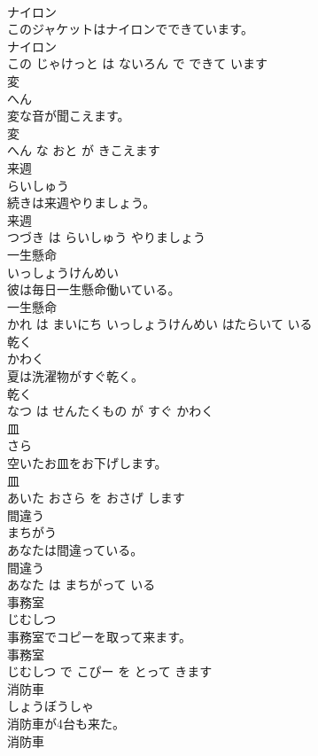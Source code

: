\documentclass[8pt]{extreport}
\begin{document}
\begin{CJK}{UTF8}{min}
\\	ナイロン	
\\	このジャケットはナイロンでできています。	
\\	ナイロン 
\\	この じゃけっと は ないろん で できて います			
\\	変	
\\	へん			
\\	変な音が聞こえます。	
\\	変 
\\	へん な おと が きこえます			
\\	来週	
\\	らいしゅう			
\\	続きは来週やりましょう。	
\\	来週 
\\	つづき は らいしゅう やりましょう			
\\	一生懸命	
\\	いっしょうけんめい			
\\	彼は毎日一生懸命働いている。	
\\	一生懸命 
\\	かれ は まいにち いっしょうけんめい はたらいて いる			
\\	乾く	
\\	かわく			
\\	夏は洗濯物がすぐ乾く。	
\\	乾く 
\\	なつ は せんたくもの が すぐ かわく			
\\	皿	
\\	さら			
\\	空いたお皿をお下げします。	
\\	皿 
\\	あいた おさら を おさげ します			
\\	間違う	
\\	まちがう			
\\	あなたは間違っている。	
\\	間違う 
\\	あなた は まちがって いる			
\\	事務室	
\\	じむしつ			
\\	事務室でコピーを取って来ます。	
\\	事務室 
\\	じむしつ で こぴー を とって きます			
\\	消防車	
\\	しょうぼうしゃ			
\\	消防車が4台も来た。	
\\	消防車 

\end{CJK}
\end{document}
